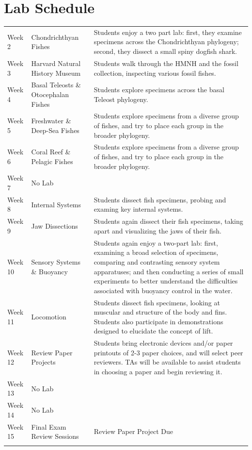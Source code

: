 \documentclass[letterpaper]{inzane_syllabus} %
\begin{document}
\newpage
\section{Lab Schedule}

\begin{center}
\begin{tabularx}{\textwidth}{p{2cm}p{6.5cm}p{11cm}}
\arrayrulecolor{myCOLOR}\hline
Week 2 & Chondrichthyan Fishes & Students enjoy a two part lab: first, they examine specimens across the Chondrichthyan phylogeny; second, they dissect a small spiny dogfish shark. \\
\arrayrulecolor{maingray}\hline 
Week 3 & Harvard Natural History Museum & Students walk through the HMNH and the fossil collection, inspecting various fossil fishes. \\
\hline 
Week 4 & Basal Teleosts \& Otocephalan Fishes & Students explore specimens across the basal Teleost phylogeny. \\
\hline 
Week 5 & Freshwater \& Deep-Sea Fishes & Students explore specimens from a diverse group of fishes, and try to place each group in the broader phylogeny. \\
\hline 
Week 6 & Coral Reef \& Pelagic Fishes & Students explore specimens from a diverse group of fishes, and try to place each group in the broader phylogeny.\\
\hline 
Week 7 & No Lab & \\ 
\hline 
Week 8 & Internal Systems & Students dissect fish specimens, probing and examing key internal systems. \\
\hline 
Week 9 & Jaw Dissections & Students again dissect their fish specimens, taking apart and visualizing the jaws of their fish. \\
\hline 
Week 10 & Sensory Systems \& Buoyancy & Students again enjoy a two-part lab: first, examining a broad selection of specimens, comparing and contrasting sensory system apparatuses; and then conducting a series of small experiments to better understand the difficulties associated with buoyancy control in the water. \\
\hline 
Week 11 & Locomotion & Students dissect fish specimens, looking at muscular and structure of the body and fins. Students also participate in demonstrations designed to elucidate the concept of lift. \\
\hline 
Week 12 & Review Paper Projects & Students bring electronic devices and/or paper printouts of 2-3 paper choices, and will select peer reviewers. TAs will be available to assist students in choosing a paper and begin reviewing it. \\
\hline 
Week 13 & No Lab & \\
\hline 
Week 14 & No Lab & \\
\hline 
Week 15 & Final Exam Review Sessions & Review Paper Project Due \\
\arrayrulecolor{myCOLOR}\hline

\end{tabularx}
\end{center}

\end{document}
